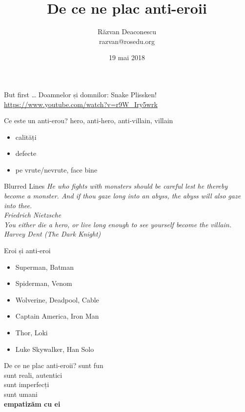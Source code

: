\documentclass{simple}
\title[Anti-eroi]{De ce ne plac anti-eroii}
\institute{ROSEdu}
\author[Răzvan Deaconescu]{Răzvan Deaconescu \\
razvan@rosedu.org}
\date{19 mai 2018}
\begin{document}
\frame{\titlepage}

\begin{frame}{But first \ldots}
  \centering
  \Large
  \pause Doamnelor și domnilor: Snake Plissken! \\
  \normalsize
  \url{https://www.youtube.com/watch?v=r9W_Iry5wrk}
\end{frame}

\begin{frame}{Ce este un anti-erou?}
  \pause hero, anti-hero, anti-villain, villain
  \begin{itemize}
    \pause \item calități
    \pause \item defecte
    \pause \item pe vrute/nevrute, face bine
  \end{itemize}
\end{frame}

\begin{frame}{Blurred Lines}
  \centering
  \pause \textit{He who fights with monsters should be careful lest he thereby become a monster. And if thou gaze long into an abyss, the abyss will also gaze into thee.} \\
  \vspace{3mm}
  \hfill \textit{Friedrich Nietzsche} \\
  \vspace{1cm}
  \pause \textit{You either die a hero, or live long enough to see yourself become the villain.} \\
  \vspace{3mm}
  \hfill \textit{Harvey Dent (The Dark Knight)}
\end{frame}

\begin{frame}{Eroi și anti-eroi}
  \begin{itemize}
    \pause \item Superman, Batman
    \pause \item Spiderman, Venom
    \pause \item Wolverine, Deadpool, Cable
    \pause \item Captain America, Iron Man
    \pause \item Thor, Loki
    \pause \item Luke Skywalker, Han Solo
  \end{itemize}
\end{frame}

\begin{frame}{De ce ne plac anti-eroii?}
  \centering
  \Large
  \pause sunt fun \\
  \pause sunt reali, autentici \\
  \pause sunt imperfecți \\
  \pause sunt umani \\
  \pause \textbf{empatizăm cu ei}
\end{frame}
\end{document}

